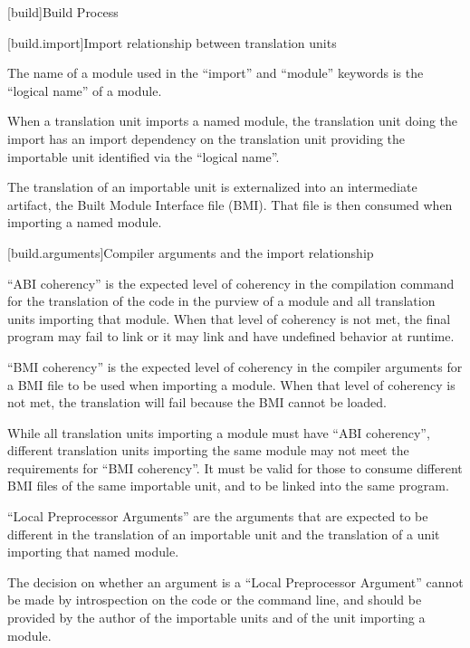 
[build]{Build Process}

%

[build.import]{Import relationship between translation units}

\pnum The name of a module used in the ``import'' and ``module''
keywords is the ``logical name'' of a module.

\pnum When a translation unit imports a named module, the translation
unit doing the import has an import dependency on the translation unit
providing the importable unit identified via the ``logical name''.

\pnum The translation of an importable unit is externalized into an
intermediate artifact, the Built Module Interface file (BMI). That
file is then consumed when importing a named module.

[build.arguments]{Compiler arguments and the import relationship}

\pnum ``ABI coherency'' is the expected level of coherency in the
compilation command for the translation of the code in the purview of a
module and all translation units importing that module. When that
level of coherency is not met, the final program may fail to link or
it may link and have undefined behavior at runtime.

\pnum ``BMI coherency'' is the expected level of coherency in the
compiler arguments for a BMI file to be used when importing a
module. When that level of coherency is not met, the translation will
fail because the BMI cannot be loaded.

\pnum While all translation units importing a module must have ``ABI
coherency'', different translation units importing the same module may
not meet the requirements for ``BMI coherency''. It must be valid for
those to consume different BMI files of the same importable unit, and
to be linked into the same program.

\pnum ``Local Preprocessor Arguments'' are the arguments that are
expected to be different in the translation of an importable unit and
the translation of a unit importing that named module.

\pnum The decision on whether an argument is a ``Local Preprocessor
Argument'' cannot be made by introspection on the code or the command
line, and should be provided by the author of the importable units
and of the unit importing a module.

